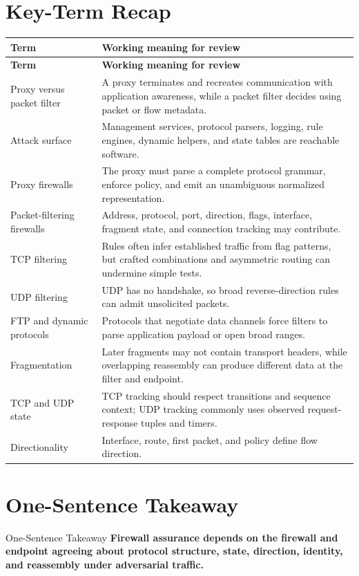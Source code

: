 \documentclass[11pt,letterpaper]{article}
\begin{document}
\section{Key-Term Recap}
\begin{longtable}{>{\raggedright\arraybackslash}p{}p{}}
\toprule
\textbf{Term} & \textbf{Working meaning for review} \\
\midrule
\endfirsthead
\toprule
\textbf{Term} & \textbf{Working meaning for review} \\
\midrule
\endhead
Proxy versus packet filter & A proxy terminates and recreates communication with application awareness, while a packet filter decides using packet or flow metadata. \\
Attack surface & Management services, protocol parsers, logging, rule engines, dynamic helpers, and state tables are reachable software. \\
Proxy firewalls & The proxy must parse a complete protocol grammar, enforce policy, and emit an unambiguous normalized representation. \\
Packet-filtering firewalls & Address, protocol, port, direction, flags, interface, fragment state, and connection tracking may contribute. \\
TCP filtering & Rules often infer established traffic from flag patterns, but crafted combinations and asymmetric routing can undermine simple tests. \\
UDP filtering & UDP has no handshake, so broad reverse-direction rules can admit unsolicited packets. \\
FTP and dynamic protocols & Protocols that negotiate data channels force filters to parse application payload or open broad ranges. \\
Fragmentation & Later fragments may not contain transport headers, while overlapping reassembly can produce different data at the filter and endpoint. \\
TCP and UDP state & TCP tracking should respect transitions and sequence context; UDP tracking commonly uses observed request-response tuples and timers. \\
Directionality & Interface, route, first packet, and policy define flow direction. \\
\bottomrule
\end{longtable}
\section{One-Sentence Takeaway}
\begin{CornellExamBox}{One-Sentence Takeaway}
\textbf{Firewall assurance depends on the firewall and endpoint agreeing about protocol structure, state, direction, identity, and reassembly under adversarial traffic.}
\end{CornellExamBox}
\end{document}

